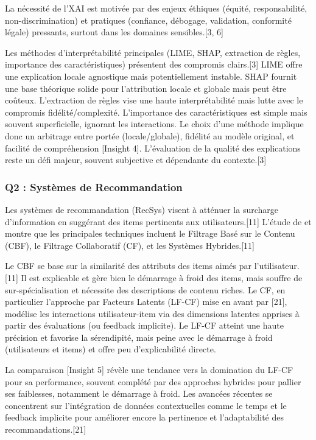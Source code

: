 \documentclass[11pt,a4paper]{article}
\begin{document}
La nécessité de l'XAI est motivée par des enjeux éthiques (équité, responsabilité, non-discrimination) et pratiques (confiance, débogage, validation, conformité légale) pressants, surtout dans les domaines sensibles.[3, 6]

Les méthodes d'interprétabilité principales (LIME, SHAP, extraction de règles, importance des caractéristiques) présentent des compromis clairs.[3] LIME offre une explication locale agnostique mais potentiellement instable. SHAP fournit une base théorique solide pour l'attribution locale et globale mais peut être coûteux. L'extraction de règles vise une haute interprétabilité mais lutte avec le compromis fidélité/complexité. L'importance des caractéristiques est simple mais souvent superficielle, ignorant les interactions. Le choix d'une méthode implique donc un arbitrage entre portée (locale/globale), fidélité au modèle original, et facilité de compréhension [Insight 4]. L'évaluation de la qualité des explications reste un défi majeur, souvent subjective et dépendante du contexte.[3]

\subsubsection{Q2 : Systèmes de Recommandation}
Les systèmes de recommandation (RecSys) visent à atténuer la surcharge d'information en suggérant des items pertinents aux utilisateurs.[11] L'étude de \citet{Ko2022} et \citet{Koren2011} montre que les principales techniques incluent le Filtrage Basé sur le Contenu (CBF), le Filtrage Collaboratif (CF), et les Systèmes Hybrides.[11]

Le CBF se base sur la similarité des attributs des items aimés par l'utilisateur.[11] Il est explicable et gère bien le démarrage à froid des items, mais souffre de sur-spécialisation et nécessite des descriptions de contenu riches. Le CF, en particulier l'approche par Facteurs Latents (LF-CF) mise en avant par \citet{Koren2011} [21], modélise les interactions utilisateur-item via des dimensions latentes apprises à partir des évaluations (ou feedback implicite). Le LF-CF atteint une haute précision et favorise la sérendipité, mais peine avec le démarrage à froid (utilisateurs et items) et offre peu d'explicabilité directe.

La comparaison [Insight 5] révèle une tendance vers la domination du LF-CF pour sa performance, souvent complété par des approches hybrides pour pallier ses faiblesses, notamment le démarrage à froid. Les avancées récentes se concentrent sur l'intégration de données contextuelles comme le temps et le feedback implicite pour améliorer encore la pertinence et l'adaptabilité des recommandations.[21]
\end{document}
